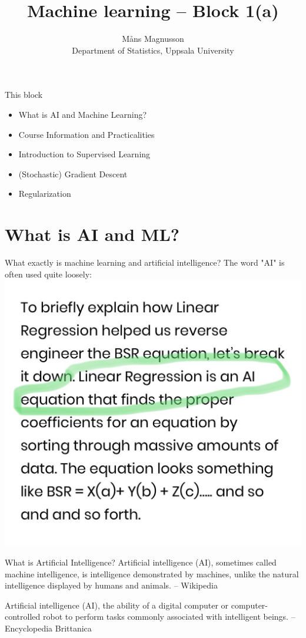 \documentclass[10pt,handout]{beamer}
\title[]{{\color{black}Machine learning -- Block 1(a)}}
\author[]{M{\aa}ns Magnusson\\Department of Statistics, Uppsala University}
\date{\currentsemester}
\begin{document}
\frame{\titlepage
}



\begin{frame}{This block}
\begin{itemize}
\item What is AI and Machine Learning?
\item Course Information and Practicalities
\item Introduction to Supervised Learning
\item (Stochastic) Gradient Descent
\item Regularization
\end{itemize}
\end{frame}

\section{What is AI and ML?}
\frame{\sectionpage}

\begin{frame}{What exactly is machine learning and artificial intelligence?}
The word "AI" is often used quite loosely:
   \includegraphics[width=\textwidth]{figs/AI-example.jpg}
\end{frame}


\begin{frame}{What is Artificial Intelligence?}
Artificial intelligence (AI), sometimes called machine intelligence, is intelligence demonstrated by machines, unlike the natural intelligence displayed by humans and animals. -- Wikipedia

Artificial intelligence (AI), the ability of a digital computer or computer-controlled robot to perform tasks commonly associated with intelligent beings. -- Encyclopedia Brittanica
\end{frame}
\end{document}
